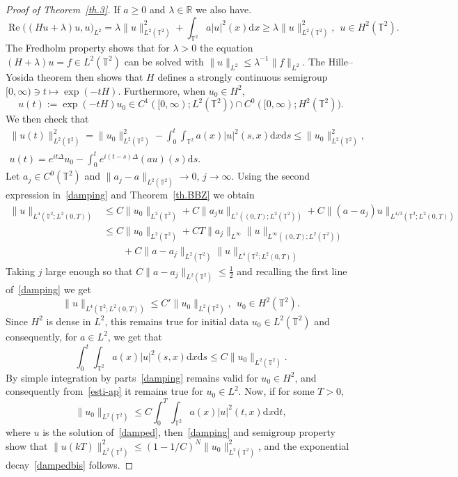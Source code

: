 \documentclass[11pt]{article}
\theoremstyle{definition}
\numberwithin{equation}{section}
\numberwithin{figure}{section}
\numberwithin{table}{section}
\DeclareMathOperator{\Reop}{Re}
\renewcommand{\Re}{\Reop}
\newcommand{\R}{{\mathbb R}}
\newcommand{\TT}{{\mathbb T}}
\newcommand*{\dd}{\mathrm{d}}
\newcommand*{\dx}{\dd x}
\newcommand*{\ds}{\dd s}
\newcommand*{\dt}{\dd t}
\begin{document}
\begin{proof}[Proof of Theorem~\ref{th.3}]
If $ a \geq 0 $ and $ \lambda \in \R $ we also have.
\[
\Re \bigl((Hu + \lambda) u, u \bigr)_{L^2} =
\lambda \| u \|_{L^2(\TT^2)} ^2 +
\int_{\TT^2} a |u|^2 (x) \dx \geq \lambda \| u \|_{L^2(\TT^2)} ^2, \ \ u \in H^2 (\TT^2).\ \
\]
The Fredholm property shows that for $\lambda >0$ the equation $(H + \lambda) u =f \in L^2(\TT^2)$ can be solved with $ \| u \|_{ L^2 } \leq \lambda^{-1} \| f \|_{L^2 } $. The Hille--Yosida theorem then shows that $ H $ defines a strongly continuous semigroup $ [0, \infty) \ni t \mapsto \exp (- t H) $. Furthermore, when $u_0 \in H^2$,
\[
u(t) := \exp (- t H) u_0 \in C^1([0, \infty) ; L^2(\TT^2))\cap C^0([0, \infty) ; H^2(\TT^2)).
\]
We then check that
\begin{equation}\label{damping}
\begin{gathered}
\| u(t) \|^2_{L^2(\TT^2)} = \| u_0 \|^2_{L^2(\TT^2)}- \int_0 ^t \int_{\TT^2} a(x) |u|^2(s,x) \dx \ds \leq \| u_0 \|^2_{L^2(\TT^2)},\\
u(t) = e^{it \Delta} u_0 - \int_0^t e^{i(t-s)\Delta} (au)(s) \ds.
\end{gathered}
\end{equation}
Let $a_j \in C^0 (\TT^2) $ and $ \| a_j - a\|_{L^2 (\TT^2) } \to 0 $, $ j \to \infty $. Using the second expression in~\eqref{damping} and Theorem~\ref{th.BBZ} we obtain
\[
\begin{split}
\| u\|_{L^4(\TT^2; L^2(0,T))} & \leq C \| u_0 \|_{L^2(\TT^2)} + C\| a_j u \|_{L^1((0,T); L^2(\TT^2))} + C\| (a- a_j)u \|_{L^{4/3}(\TT^2; L^2(0,T))}\\
& \leq C \| u_0 \|_{L^2(\TT^2)} +C T\| a_j\|_{L^\infty} \| u\|_{L^{\infty}((0,T); L^2(\TT^2))}
\\ & \qquad +C\| a-a_j\|_{L^2(\TT^2)} \| u \|_{L^{4}(\TT^2; L^2(0,T))}
\end{split}
\]
Taking $ j$ large enough so that $C\| a-a_j\|_{L^2(\TT^2)} \leq \frac12$ and recalling the first line of~\eqref{damping} we get
\[
\| u\|_{L^4(\TT^2; L^2(0,T))} \leq C' \| u_0 \|_{L^2(\TT^2)}, \ \
u_0 \in H^2 (\TT^2).
\]
Since $ H^2 $ is dense in $L ^2 $, this remains true for initial data $u_0\in L^2(\TT^2)$ and consequently, for $ a \in L^2 $, we get that
\begin{equation}\label{esti-ap}
\int_0 ^t \int_{\TT^2} a(x) |u|^2(s,x) \dx \ds\leq C \| u_0 \|_{L^2(\TT^2)}.
\end{equation}
By simple integration by parts~\eqref{damping} remains valid for $u_0\in H^2$, and consequently from~\eqref{esti-ap} it remains true for $u_0\in L^2$. Now, if for some $ T > 0 $,
\begin{equation}\label{eq:u00}
\| u_0 \|_{L^2(\TT^2)} \leq C \int_0 ^T \int_{\TT^2} a(x) |u|^2(t,x) \dx \dt,
\end{equation}
where $u$ is the solution of~\eqref{damped}, then~\eqref{damping} and semigroup property show that $ \| u (k T) \|_{ L^2 (\TT^2)}^2 \leq (1 - 1/C)^N \| u_0 \|_{ L^2 (\TT^2) }^2$, and the exponential decay~\eqref{dampedbis} follows.


\end{proof}
\end{document}
